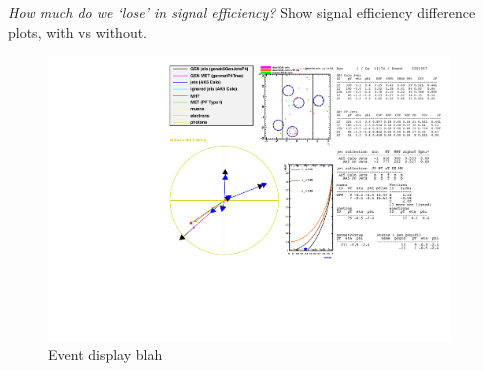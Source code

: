 \emph{How much do we `lose' in signal efficiency?} Show signal efficiency
difference plots, with vs without.

\clearpage

\begin{figure}
    \centering
    \includegraphics[width=0.95\textwidth]
    {Figs/eventDisplays/Had_QCD_MG_MC_HT375_skim_displays_singleEvent.pdf}
    \caption{Event display blah}
    \label{fig:event_display_QCD}
\end{figure}
